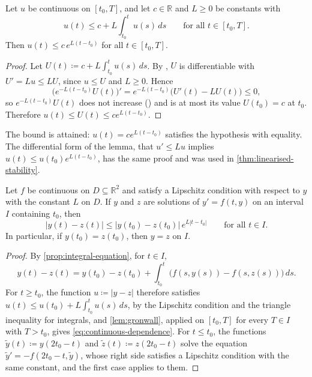 \begin{lemma}
\label{lem:gronwall}
Let $u$ be continuous on $[t_0,T]$, and let $c\in\mathbb R$ and $L\ge0$ be constants with
\[
u(t)\le c+L\int_{t_0}^tu(s)\,ds\qquad\text{for all }t\in[t_0,T].
\]
Then $u(t)\le c\,e^{L(t-t_0)}$ for all $t\in[t_0,T]$.
\end{lemma}

\begin{proof}
Let $U(t)\coloneqq c+L\int_{t_0}^tu(s)\,ds$. By , $U$ is differentiable with $U'=Lu\le LU$, since $u\le U$ and $L\ge0$. Hence
\[
\bigl(e^{-L(t-t_0)}U(t)\bigr)'=e^{-L(t-t_0)}\bigl(U'(t)-LU(t)\bigr)\le0 ,
\]
so $e^{-L(t-t_0)}U(t)$ does not increase () and is at most its value $U(t_0)=c$ at $t_0$. Therefore $u(t)\le U(t)\le ce^{L(t-t_0)}$.
\end{proof}

The bound is attained: $u(t)=ce^{L(t-t_0)}$ satisfies the hypothesis with equality. The differential form of the lemma, that $u'\le Lu$ implies $u(t)\le u(t_0)e^{L(t-t_0)}$, has the same proof and was used in \cref{thm:linearised-stability}.

\begin{theorem}
\label{thm:uniqueness}
Let $f$ be continuous on $D\subseteq\mathbb R^2$ and satisfy a Lipschitz condition with respect to $y$ with the constant $L$ on $D$. If $y$ and $z$ are solutions of $y'=f(t,y)$ on an interval $I$ containing $t_0$, then
\begin{equation}
|y(t)-z(t)|\le|y(t_0)-z(t_0)|\,e^{L|t-t_0|}\qquad\text{for all }t\in I .
\label{eq:continuous-dependence}
\end{equation}
In particular, if $y(t_0)=z(t_0)$, then $y=z$ on $I$.
\end{theorem}

\begin{proof}
By \cref{prop:integral-equation}, for $t\in I$,
\[
y(t)-z(t)=y(t_0)-z(t_0)+\int_{t_0}^t\bigl(f(s,y(s))-f(s,z(s))\bigr)\,ds .
\]
For $t\ge t_0$, the function $u\coloneqq|y-z|$ therefore satisfies $u(t)\le u(t_0)+L\int_{t_0}^tu(s)\,ds$, by the Lipschitz condition and the triangle inequality for integrals, and \cref{lem:gronwall}, applied on $[t_0,T]$ for every $T\in I$ with $T>t_0$, gives \eqref{eq:continuous-dependence}. For $t\le t_0$, the functions $\tilde y(t)\coloneqq y(2t_0-t)$ and $\tilde z(t)\coloneqq z(2t_0-t)$ solve the equation $\tilde y'=-f(2t_0-t,\tilde y)$, whose right side satisfies a Lipschitz condition with the same constant, and the first case applies to them.
\end{proof}

